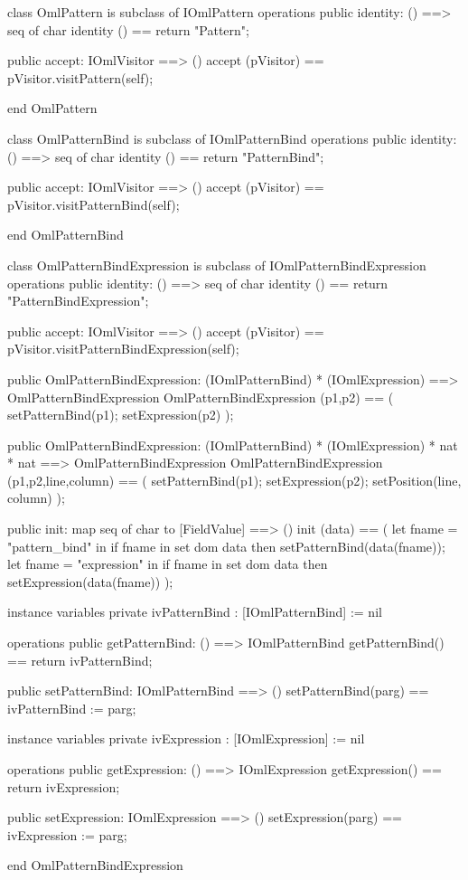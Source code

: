 \begin{vdm_al}
class OmlPattern is subclass of IOmlPattern
operations
  public identity: () ==> seq of char
  identity () == return "Pattern";

  public accept: IOmlVisitor ==> ()
  accept (pVisitor) == pVisitor.visitPattern(self);

end OmlPattern
\end{vdm_al}
\begin{vdm_al}
class OmlPatternBind is subclass of IOmlPatternBind
operations
  public identity: () ==> seq of char
  identity () == return "PatternBind";

  public accept: IOmlVisitor ==> ()
  accept (pVisitor) == pVisitor.visitPatternBind(self);

end OmlPatternBind
\end{vdm_al}
\begin{vdm_al}
class OmlPatternBindExpression is subclass of IOmlPatternBindExpression
operations
  public identity: () ==> seq of char
  identity () == return "PatternBindExpression";

  public accept: IOmlVisitor ==> ()
  accept (pVisitor) == pVisitor.visitPatternBindExpression(self);

  public OmlPatternBindExpression:
    (IOmlPatternBind) *
    (IOmlExpression) ==> OmlPatternBindExpression
  OmlPatternBindExpression (p1,p2) == 
    ( setPatternBind(p1);
      setExpression(p2) );

  public OmlPatternBindExpression:
    (IOmlPatternBind) *
    (IOmlExpression) *
    nat *
    nat ==> OmlPatternBindExpression
  OmlPatternBindExpression (p1,p2,line,column) == 
    ( setPatternBind(p1);
      setExpression(p2);
      setPosition(line, column) );

  public init: map seq of char to [FieldValue] ==> ()
  init (data) ==
    ( let fname = "pattern_bind" in
        if fname in set dom data
        then setPatternBind(data(fname));
      let fname = "expression" in
        if fname in set dom data
        then setExpression(data(fname)) );

instance variables
  private ivPatternBind : [IOmlPatternBind] := nil

operations
  public getPatternBind: () ==> IOmlPatternBind
  getPatternBind() == return ivPatternBind;

  public setPatternBind: IOmlPatternBind ==> ()
  setPatternBind(parg) == ivPatternBind := parg;

instance variables
  private ivExpression : [IOmlExpression] := nil

operations
  public getExpression: () ==> IOmlExpression
  getExpression() == return ivExpression;

  public setExpression: IOmlExpression ==> ()
  setExpression(parg) == ivExpression := parg;

end OmlPatternBindExpression
\end{vdm_al}

